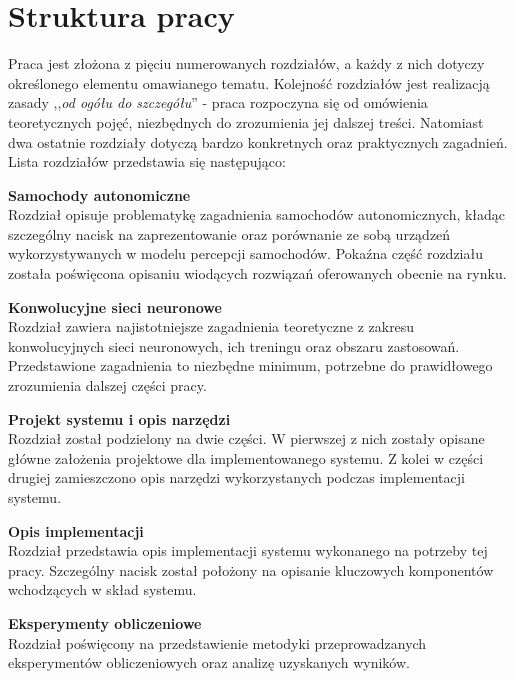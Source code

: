 \section*{Struktura pracy}
Praca jest złożona z pięciu numerowanych rozdziałów, a każdy z nich dotyczy określonego elementu omawianego tematu. Kolejność rozdziałów jest realizacją zasady ,,\textit{od ogółu do szczegółu}'' - praca rozpoczyna się od omówienia teoretycznych pojęć, niezbędnych do zrozumienia jej dalszej treści. Natomiast dwa ostatnie rozdziały dotyczą bardzo konkretnych oraz praktycznych zagadnień. Lista rozdziałów przedstawia się następująco:
\begin{enumerate*}
\item \textbf{Samochody autonomiczne} \\
Rozdział opisuje problematykę zagadnienia samochodów autonomicznych, kładąc szczególny nacisk na zaprezentowanie oraz porównanie ze sobą urządzeń wykorzystywanych w modelu percepcji samochodów. Pokaźna część rozdziału została poświęcona opisaniu wiodących rozwiązań oferowanych obecnie na rynku.
\item \textbf{Konwolucyjne sieci neuronowe} \\
Rozdział zawiera najistotniejsze zagadnienia teoretyczne z zakresu konwolucyjnych sieci neuronowych, ich treningu oraz obszaru zastosowań. Przedstawione zagadnienia to niezbędne minimum, potrzebne do prawidłowego zrozumienia dalszej części pracy.
\item \textbf{Projekt systemu i opis narzędzi} \\
Rozdział został podzielony na dwie części. W pierwszej z nich zostały opisane główne założenia projektowe dla implementowanego systemu. Z kolei w części drugiej zamieszczono opis narzędzi wykorzystanych podczas implementacji systemu.
\item \textbf{Opis implementacji} \\
Rozdział przedstawia opis implementacji systemu wykonanego na potrzeby tej pracy. Szczególny nacisk został położony na opisanie kluczowych komponentów wchodzących w skład systemu.
\item \textbf{Eksperymenty obliczeniowe} \\
Rozdział poświęcony na przedstawienie metodyki przeprowadzanych eksperymentów obliczeniowych oraz analizę uzyskanych wyników.
\end{enumerate*}